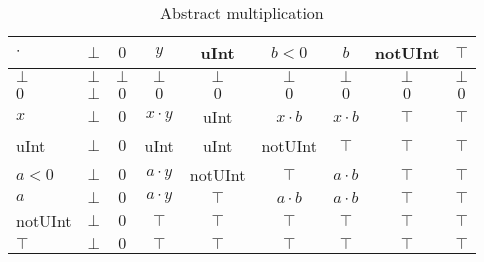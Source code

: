 \begin{table}[htbp]
\centering
\begin{tabular}{l|cccccccc}
$\cdot$ & $\bot$ & $0$    & $y$         & uInt    & $b < 0$     & $b$         & notUInt & $\top$ \\\hline
$\bot$  & $\bot$ & $\bot$ & $\bot$      & $\bot$  & $\bot$      & $\bot$      & $\bot$  & $\bot$ \\
$0$     & $\bot$ & $0$    & $0$         & $0$     & $0$         & $0$         & $0$     & $0$    \\
$x$     & $\bot$ & $0$    & $x\cdot y$  & uInt    & $x\cdot b$  & $x\cdot b$  & $\top$  & $\top$ \\
uInt    & $\bot$ & $0$    & uInt        & uInt    & notUInt     & $\top$      & $\top$  & $\top$ \\
$a < 0$ & $\bot$ & $0$    & $a\cdot y$  & notUInt & $\top$      & $a\cdot b$  & $\top$  & $\top$ \\
$a$     & $\bot$ & $0$    & $a \cdot y$ & $\top$  & $a \cdot b$ & $a \cdot b$ & $\top$  & $\top$ \\
notUInt & $\bot$ & $0$    & $\top$      & $\top$  & $\top$      & $\top$      & $\top$  & $\top$ \\
$\top$  & $\bot$ & $0$    & $\top$      & $\top$  & $\top$      & $\top$      & $\top$  & $\top$
\end{tabular}
\caption{Abstract multiplication}
\label{tab:abstract_multiplication}
\end{table}

